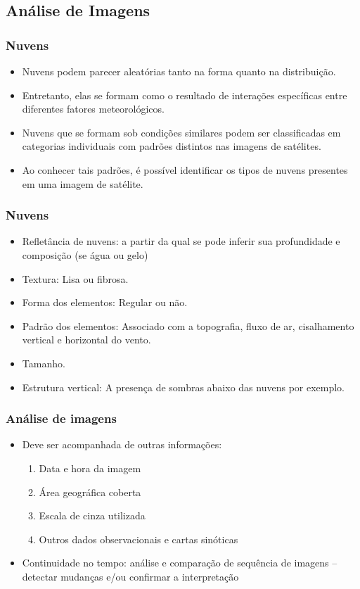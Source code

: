 \subsection{Análise de Imagens}
\begin{frame}
\frametitle{Nuvens}
  \begin{itemize}[<+-| alert@+>]
    \item Nuvens podem parecer aleatórias tanto na forma quanto na distribuição.
    \item Entretanto, elas se formam como o resultado de interações específicas
          entre diferentes fatores meteorológicos.
    \item Nuvens que se formam sob condições similares podem ser classificadas
          em categorias individuais com padrões distintos nas imagens de
          satélites.
    \item Ao conhecer tais padrões, é possível identificar os tipos de nuvens
          presentes em uma imagem de satélite.
  \end{itemize}
\end{frame}


\begin{frame}
\frametitle{Nuvens}
  \begin{itemize}[<+-| alert@+>]
    \item Refletância de nuvens: a partir da qual se pode inferir sua
          profundidade e composição (se água ou gelo)
    \item Textura: Lisa ou fibrosa.
    \item Forma dos elementos: Regular ou não.
    \item Padrão dos elementos: Associado com a topografia, fluxo de ar,
          cisalhamento vertical e horizontal do vento.
    \item Tamanho.
    \item Estrutura vertical: A presença de sombras abaixo das nuvens por
          exemplo.
  \end{itemize}
\end{frame}


\begin{frame}
\frametitle{Análise de imagens}
  \begin{itemize}[<+-| alert@+>]
    \item Deve ser acompanhada de outras informações:
    \begin{enumerate}
      \item Data e hora da imagem
      \item Área geográfica coberta
      \item Escala de cinza utilizada
      \item Outros dados observacionais e cartas sinóticas
    \end{enumerate}
    \item Continuidade no tempo: análise e comparação de sequência de imagens
          -- detectar mudanças e/ou confirmar a interpretação
  \end{itemize}
\end{frame}


